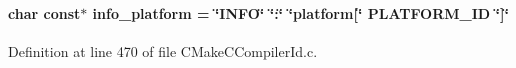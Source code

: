 \hypertarget{a00097_a2321403dee54ee23f0c2fa849c60f7d4}{}
\paragraph[{info\+\_\+platform}]{\setlength{\rightskip}{0pt plus 5cm}char const$\ast$ info\+\_\+platform = \char`\"{}I\+N\+F\+O\char`\"{} \char`\"{}\+:\char`\"{} \char`\"{}platform\mbox{[}\char`\"{} P\+L\+A\+T\+F\+O\+R\+M\+\_\+\+I\+D \char`\"{}\mbox{]}\char`\"{}}\label{a00097_a2321403dee54ee23f0c2fa849c60f7d4}


Definition at line 470 of file C\+Make\+C\+Compiler\+Id.\+c.


